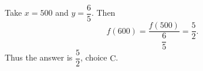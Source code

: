 Take $x=500$ and $y=\dfrac{6}{5}$. Then
\[
f(600)=\dfrac{f(500)}{\dfrac{6}{5}}=\dfrac{5}{2}.
\]
Thus the answer is $\boxed{\dfrac{5}{2}}$, choice $\boxed{\text{C}}$.
